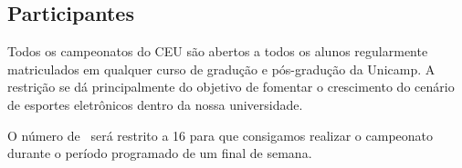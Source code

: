 \subsection{Participantes}

Todos os campeonatos do CEU são abertos a todos os alunos regularmente matriculados em qualquer curso de gradução e pós-gradução da Unicamp. A restrição se dá principalmente do objetivo de fomentar o crescimento do cenário de esportes eletrônicos dentro da nossa universidade.

O número de \BasicUnitPl\ será restrito a 16 para que consigamos realizar o campeonato durante o período programado de um final de semana.